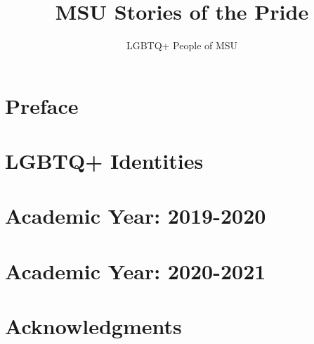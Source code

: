 \documentclass[12pt,letterpaper,footinclude=true,headinclude=true]{book} %
\title{MSU Stories of the Pride}
\author{LGBTQ+ People of MSU}
\begin{document}
	\maketitle
	
	\tableofcontents 
	
	
	
	\chapter*{Preface}
    

	\chapter{LGBTQ+ Identities}
	
	
	\chapter{Academic Year: 2019-2020}
	
	
	\chapter{Academic Year: 2020-2021}
	
	
	\chapter*{Acknowledgments}
	
	
	
	{
		
		
		
	}
\end{document}

